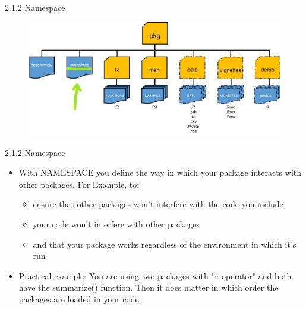 \documentclass[11pt,a4paper]{beamer}
\begin{document}
\begin{frame}[t]{2.1.2 Namespace}
	
	
	\begin{figure}
		\centering
		\includegraphics[width=0.9\linewidth]{Names}
		\label{fig:packages}
	\end{figure}
	
	
\end{frame}




\begin{frame}[t]{2.1.2 Namespace}
	
	\begin{itemize}
		\item With NAMESPACE you define  the way in which your package interacts with other packages. For Example, to:
		\begin{itemize}
			\item ensure that other	packages won’t	interfere	with the code you include 
			\item	your code	won’t	interfere	with	other	packages 	
			\item and	that	your	package	works	regardless	of	the
			environment	in	which	it’s	run
		\end{itemize}
		
		
		\item Practical example: You are using two packages with "::	operator" and both have the summarize() function. Then it does matter in which order the packages are loaded in your code. 
		
	\end{itemize}
	
\end{frame}
\end{document}
